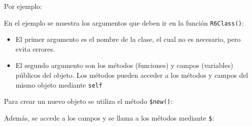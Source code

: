 \documentclass[
]{book}
\newenvironment{Shaded}{\begin{snugshade}}{\end{snugshade}}
\newcommand{\AttributeTok}[1]{\textcolor[rgb]{0.13,0.29,0.53}{#1}}
\newcommand{\ControlFlowTok}[1]{\textcolor[rgb]{0.13,0.29,0.53}{\textbf{#1}}}
\newcommand{\DecValTok}[1]{\textcolor[rgb]{0.00,0.00,0.81}{#1}}
\newcommand{\DocumentationTok}[1]{\textcolor[rgb]{0.56,0.35,0.01}{\textbf{\textit{#1}}}}
\newcommand{\FunctionTok}[1]{\textcolor[rgb]{0.13,0.29,0.53}{\textbf{#1}}}
\newcommand{\NormalTok}[1]{#1}
\newcommand{\OtherTok}[1]{\textcolor[rgb]{0.56,0.35,0.01}{#1}}
\newcommand{\SpecialCharTok}[1]{\textcolor[rgb]{0.81,0.36,0.00}{\textbf{#1}}}
\newcommand{\StringTok}[1]{\textcolor[rgb]{0.31,0.60,0.02}{#1}}
\begin{document}
Por ejemplo:

\begin{Shaded}
\end{Shaded}

En el ejemplo se muestra los argumentos que deben ir en la función \texttt{R6Class()}:

\begin{itemize}
\item
  El primer argumento es el nombre de la clase, el cual no es necesario, pero evita errores.
\item
  El segundo argumento son los métodos (funciones) y campos (variables) públicos del objeto. Los métodos pueden acceder a los métodos y campos del mismo objeto mediante \texttt{self}
\end{itemize}

Para crear un nuevo objeto se utiliza el método \texttt{\$new()}:

\begin{Shaded}
\end{Shaded}

Además, se accede a los campos y se llama a los métodos mediante \texttt{\$}:

\begin{Shaded}
\end{Shaded}
\end{document}
